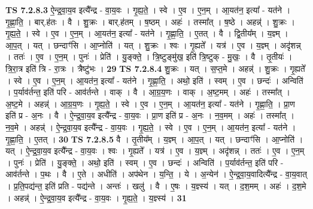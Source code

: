 \documentclass[17pt]{extarticle}
\begin{document}
                  \newline
                                \textbf{ TS 7.2.8.3} \newline
                  ऐ॒न्द्र॒वा॒य॒व इत्यै᳚न्द्र - वा॒य॒वः । गृ॒ह्य॒ते॒ । स्वे । ए॒व । ए॒न॒म् । आ॒यत॑न॒ इत्या᳚ - यत॑ने । गृ॒ह्णा॒ति॒ । बार्.ह॑तः । वै । शु॒क्रः । बार्.ह॑तम् । ष॒ष्ठम् । अहः॑ । तस्मा᳚त् । ष॒ष्ठे । अहन्न्॑ । शु॒क्रः । गृ॒ह्य॒ते॒ । स्वे । ए॒व । ए॒न॒म् । आ॒यत॑न॒ इत्या᳚ - यत॑ने । गृ॒ह्णा॒ति॒ । ए॒तत् । वै । द्वि॒तीय᳚म् । य॒ज्ञ्म् । आ॒प॒त् । यत् । छन्दाꣳ॑सि । आ॒प्नोति॑ । यत् । शु॒क्रः । श्वः । गृ॒ह्यते᳚ । यत्र॑ । ए॒व । य॒ज्ञ्म् । अदृ॑शन्न् । ततः॑ । ए॒व । ए॒न॒म् । पुनः॑ । प्रेति॑ । यु॒ङ्क्ते॒ । त्रि॒ष्टुङ्मु॑ख॒ इति॑ त्रि॒ष्टुक् - मु॒खः॒ । वै । तृ॒तीयः॑ । त्रि॒रा॒त्र इति॑ त्रि - रा॒त्रः । त्रैष्टु॑भः । \textbf{  29} \newline
                  \newline
                                \textbf{ TS 7.2.8.4} \newline
                  शु॒क्रः । यत् । स॒प्त॒मे । अहन्न्॑ । शु॒क्रः । गृ॒ह्यते᳚ । स्वे । ए॒व । ए॒न॒म् । आ॒यत॑न॒ इत्या᳚ - यत॑ने । गृ॒ह्णा॒ति॒ । अथो॒ इति॑ । स्वम् । ए॒व । छन्दः॑ । अन्विति॑ । प॒र्याव॑र्तन्त॒ इति॑ परि - आव॑र्तन्ते । वाक् । वै । आ॒ग्र॒य॒णः । वाक् । अ॒ष्ट॒मम् । अहः॑ । तस्मा᳚त् । अ॒ष्ट॒मे । अहन्न्॑ । आ॒ग्र॒य॒णः । गृ॒ह्य॒ते॒ । स्वे । ए॒व । ए॒न॒म् । आ॒यत॑न॒ इत्या᳚ - यत॑ने । गृ॒ह्णा॒ति॒ । प्रा॒ण इति॑ प्र - अ॒नः । वै । ऐ॒न्द्र॒वा॒य॒व इत्यै᳚न्द्र - वा॒य॒वः । प्रा॒ण इति॑ प्र - अ॒नः । न॒व॒मम् । अहः॑ । तस्मा᳚त् । न॒व॒मे । अहन्न्॑ । ऐ॒न्द्र॒वा॒य॒व इत्यै᳚न्द्र - वा॒य॒वः । गृ॒ह्य॒ते॒ । स्वे । ए॒व । ए॒न॒म् । आ॒यत॑न॒ इत्या᳚ - यत॑ने । गृ॒ह्णा॒ति॒ । ए॒तत् । \textbf{  30} \newline
                  \newline
                                \textbf{ TS 7.2.8.5} \newline
                  वै । तृ॒तीय᳚म् । य॒ज्ञ्म् । आ॒प॒त् । यत् । छन्दाꣳ॑सि । आ॒प्नोति॑ । यत् । ऐ॒न्द्र॒वा॒य॒व इत्यै᳚न्द्र - वा॒य॒वः । श्वः । गृ॒ह्यते᳚ । यत्र॑ । ए॒व । य॒ज्ञ्म् । अदृ॑शन्न् । ततः॑ । ए॒व । ए॒न॒म् । पुनः॑ । प्रेति॑ । यु॒ङ्क्ते॒ । अथो॒ इति॑ । स्वम् । ए॒व । छन्दः॑ । अन्विति॑ । प॒र्याव॑र्तन्त॒ इति॑ परि - आव॑र्तन्ते । प॒थः । वै । ए॒ते । अधीति॑ । अप॑थेन । य॒न्ति॒ । ये । अ॒न्येन॑ । ऐ॒न्द्र॒वा॒य॒वादित्यै᳚न्द्र - वा॒य॒वात् । प्र॒ति॒पद्य॑न्त॒ इति॑ प्रति - पद्य॑न्ते । अन्तः॑ । खलु॑ । वै । ए॒षः । य॒ज्ञ्स्य॑ । यत् । द॒श॒मम् । अहः॑ । द॒श॒मे । अहन्न्॑ । ऐ॒न्द्र॒वा॒य॒व इत्यै᳚न्द्र - वा॒य॒वः । गृ॒ह्य॒ते॒ । य॒ज्ञ्स्य॑ । \textbf{  31} \newline
                  \newline
\end{document}
